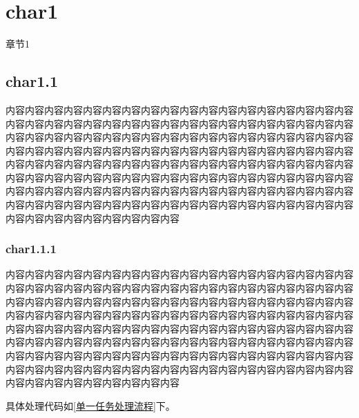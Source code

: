 \chapter{char1}
章节1


\section{char1.1}
内容内容内容内容内容内容内容内容内容内容内容内容内容内容内容内容内容内容内容内容内容内容内容内容内容内容内容内容内容内容内容内容内容内容内容内容内容内容内容内容内容内容内容内容内容内容内容内容内容内容内容内容内容内容内容内容内容内容内容内容内容内容内容内容内容内容内容内容内容内容内容内容内容内容内容内容内容内容内容内容内容内容内容内容内容内容内容内容内容内容内容内容内容内容内容内容内容内容内容内容内容内容内容内容内容内容内容内容内容内容内容内容内容内容内容内容内容内容内容内容内容内容内容内容内容内容内容内容内容内容内容内容内容内容内容内容内容内容内容内容内容内容内容内容内容内容内容内容内容内容内容内容内容
\subsection{char1.1.1}
内容内容内容内容内容内容内容内容内容内容内容内容内容内容内容内容内容内容内容内容内容内容内容内容内容内容内容内容内容内容内容内容内容内容内容内容内容内容内容内容内容内容内容内容内容内容内容内容内容内容内容内容内容内容内容内容内容内容内容内容内容内容内容内容内容内容内容内容内容内容内容内容内容内容内容内容内容内容内容内容内容内容内容内容内容内容内容内容内容内容内容内容内容内容内容内容内容内容内容内容内容内容内容内容内容内容内容内容内容内容内容内容内容内容内容内容内容内容内容内容内容内容内容内容内容内容内容内容内容内容内容内容内容内容内容内容内容内容内容内容内容内容内容内容内容内容内容内容内容内容内容内容内容


具体处理代码如\ref{单一任务处理流程}下。

